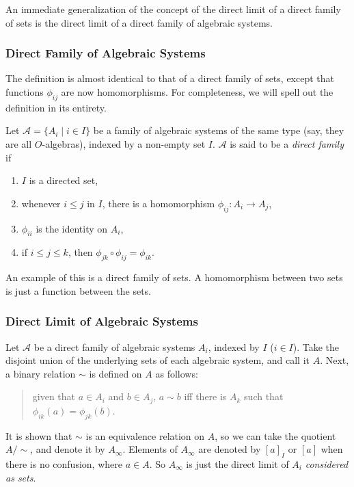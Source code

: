 \documentclass[12pt]{article}
\begin{document}
An immediate generalization of the concept of the direct limit of a direct family of sets is the direct limit of a direct family of algebraic systems.

\subsubsection*{Direct Family of Algebraic Systems}

The definition is almost identical to that of a direct family of sets, except that functions $\phi_{ij}$ are now homomorphisms.  For completeness, we will spell out the definition in its entirety.

Let $\mathcal{A}=\lbrace A_i\mid i\in I\rbrace$ be a family of algebraic systems of the same type (say, they are all $O$-algebras), indexed by a non-empty set $I$.  $\mathcal{A}$ is said to be a \emph{direct family} if 
\begin{enumerate}
\item $I$ is a directed set,
\item whenever $i\le j$ in $I$, there is a homomorphism $\phi_{ij}:A_i\to A_j$,
\item $\phi_{ii}$ is the identity on $A_i$,
\item if $i\le j\le k$, then $\phi_{jk}\circ \phi_{ij}=\phi_{ik}$.
\end{enumerate}

An example of this is a direct family of sets.  A homomorphism between two sets is just a function between the sets.

\subsubsection*{Direct Limit of Algebraic Systems}

Let $\mathcal{A}$ be a direct family of algebraic systems $A_i$, indexed by $I$ ($i\in I$).  Take the disjoint union of the underlying sets of each algebraic system, and call it $A$.  Next, a binary relation $\sim$ is defined on $A$ as 
follows: 
\begin{quote}
given that $a\in A_i$ and $b\in A_j$, $a\sim b$ iff there is $A_k$ such that $\phi_{ik}(a)=\phi_{jk}(b)$.
\end{quote}

It is shown  that $\sim$ is an equivalence relation on $A$, so we can take the quotient $A/\sim$, and denote it by $A_{\infty}$.  Elements of $A_{\infty}$ are denoted by $[a]_I$ or $[a]$ when there is no confusion, where $a\in A$.  So $A_{\infty}$ is just the direct limit of $A_i$ \emph{considered as sets}.
\end{document}
